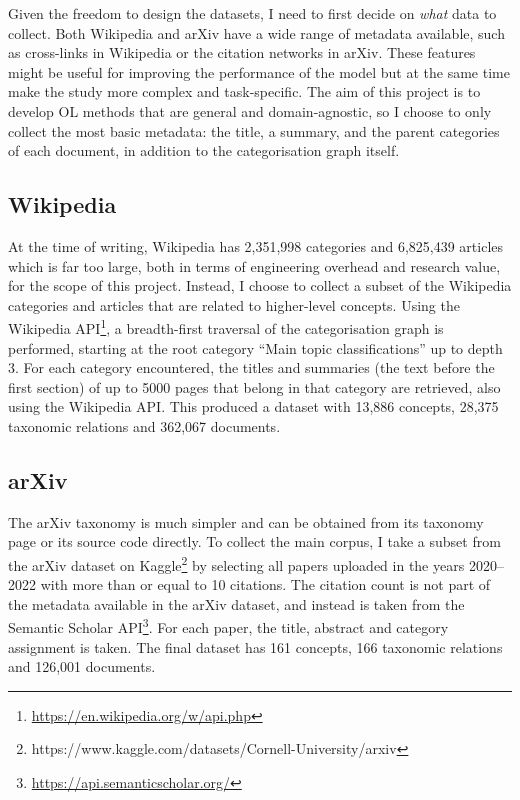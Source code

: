 Given the freedom to design the datasets, I need to first decide on \emph{what} data to collect. Both Wikipedia and arXiv have a wide range of metadata available, such as cross-links in Wikipedia or the citation networks in arXiv. These features might be useful for improving the performance of the model but at the same time make the study more complex and task-specific. The aim of this project is to develop OL methods that are general and domain-agnostic, so I choose to only collect the most basic metadata: the title, a summary, and the parent categories of each document, in addition to the categorisation graph itself.

\subsection{Wikipedia}

At the time of writing, Wikipedia has 2,351,998 categories and 6,825,439 articles which is far too large, both in terms of engineering overhead and research value, for the scope of this project. Instead, I choose to collect a subset of the Wikipedia categories and articles that are related to higher-level concepts. Using the Wikipedia API\footnote{\url{https://en.wikipedia.org/w/api.php}}, a breadth-first traversal of the categorisation graph is performed, starting at the root category ``Main topic classifications'' up to depth 3. For each category encountered, the titles and summaries (the text before the first section) of up to 5000 pages that belong in that category are retrieved, also using the Wikipedia API. This produced a dataset with 13,886 concepts, 28,375 taxonomic relations and 362,067 documents.

\subsection{arXiv}

The arXiv taxonomy is much simpler and can be obtained from its taxonomy page or its source code directly. To collect the main corpus, I take a subset from the arXiv dataset on Kaggle\footnote{https://www.kaggle.com/datasets/Cornell-University/arxiv} by selecting all papers uploaded in the years 2020--2022 with more than or equal to 10 citations. The citation count is not part of the metadata available in the arXiv dataset, and instead is taken from the Semantic Scholar API\footnote{\url{https://api.semanticscholar.org/}}. For each paper, the title, abstract and category assignment is taken. The final dataset has 161 concepts, 166 taxonomic relations and 126,001 documents.


